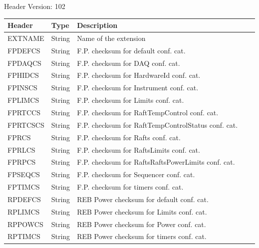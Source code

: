 Header Version: 102


\begin{tabular}{l l l l l}

\hline
Header & Type & Description \\
\hline
EXTNAME & String & Name of the extension \\
FPDEFCS & String & F.P. checksum for default conf. cat. \\
FPDAQCS & String & F.P. checksum for DAQ conf. cat. \\
FPHIDCS & String & F.P. checksum for HardwareId conf. cat. \\
FPINSCS & String & F.P. checksum for Instrument conf. cat. \\
FPLIMCS & String & F.P. checksum for Limits conf. cat. \\
FPRTCCS & String & F.P. checksum for RaftTempControl conf. cat. \\
FPRTCSCS & String & F.P. checksum for RaftTempControlStatus conf. cat. \\
FPRCS & String & F.P. checksum for Rafts conf. cat. \\
FPRLCS & String & F.P. checksum for RaftsLimits conf. cat. \\
FPRPCS & String & F.P. checksum for RaftsRaftsPowerLimits conf. cat. \\
FPSEQCS & String & F.P. checksum for Sequencer conf. cat. \\
FPTIMCS & String & F.P. checksum for timers conf. cat. \\
RPDEFCS & String & REB Power checksum for default conf. cat. \\
RPLIMCS & String & REB Power checksum for Limits conf. cat. \\
RPPOWCS & String & REB Power checksum for Power conf. cat. \\
RPTIMCS & String & REB Power checksum for timers conf. cat. \\
\hline
\end{tabular}

